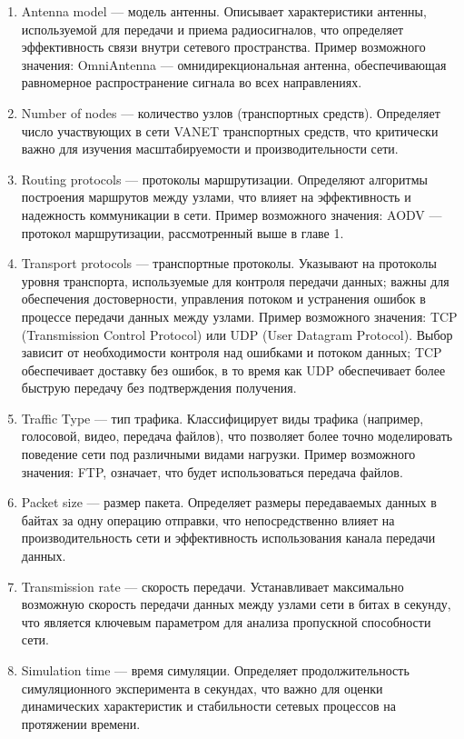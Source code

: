 \begin{enumerate}
  \item Antenna model --- модель антенны. Описывает характеристики антенны, используемой для передачи и приема радиосигналов, что определяет эффективность связи внутри сетевого пространства. Пример возможного значения: OmniAntenna --- омнидирекциональная антенна, обеспечивающая равномерное распространение сигнала во всех направлениях.
  \item Number of nodes --- количество узлов (транспортных средств). Определяет число участвующих в сети VANET транспортных средств, что критически важно для изучения масштабируемости и производительности сети.
  \item Routing protocols --- протоколы маршрутизации. Определяют алгоритмы построения маршрутов между узлами, что влияет на эффективность и надежность коммуникации в сети. Пример возможного значения: AODV --- протокол маршрутизации, рассмотренный выше в главе 1.
  \item Transport protocols --- транспортные протоколы. Указывают на протоколы уровня транспорта, используемые для контроля передачи данных; важны для обеспечения достоверности, управления потоком и устранения ошибок в процессе передачи данных между узлами. Пример возможного значения: TCP (Transmission Control Protocol) или UDP (User Datagram Protocol). Выбор зависит от необходимости контроля над ошибками и потоком данных; TCP обеспечивает доставку без ошибок, в то время как UDP обеспечивает более быструю передачу без подтверждения получения.
  \item Traffic Type --- тип трафика. Классифицирует виды трафика (например, голосовой, видео, передача файлов), что позволяет более точно моделировать поведение сети под различными видами нагрузки. Пример возможного значения: FTP, означает, что будет использоваться передача файлов.
  \item Packet size --- размер пакета. Определяет размеры передаваемых данных в байтах за одну операцию отправки, что непосредственно влияет на производительность сети и эффективность использования канала передачи данных.
  \item Transmission rate --- скорость передачи. Устанавливает максимально возможную скорость передачи данных между узлами сети в битах в секунду, что является ключевым параметром для анализа пропускной способности сети.
  \item Simulation time --- время симуляции. Определяет продолжительность симуляционного эксперимента в секундах, что важно для оценки динамических характеристик и стабильности сетевых процессов на протяжении времени.
\end{enumerate}

